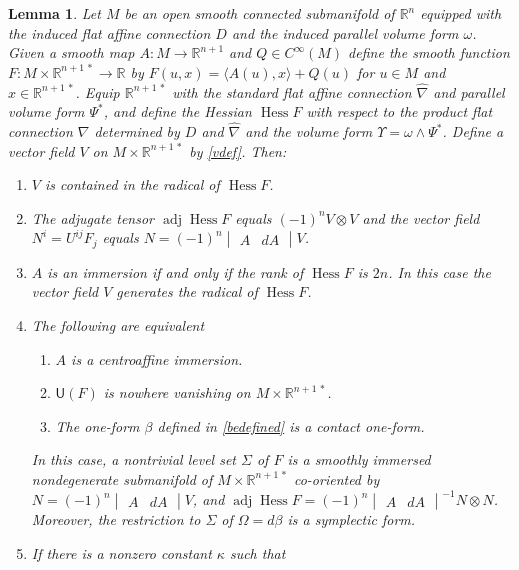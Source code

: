 \documentclass [leqno, 10pt]{amsart}
\newtheorem{lemma}[theorem]{Lemma}
\theoremstyle{definition}
\numberwithin{equation}{section}
\newcommand{\Om}{\Omega}
\newcommand{\U}{\mathsf{U}}
\newcommand{\om}{\omega}
\newcommand{\hess}{\operatorname{Hess}}
\newcommand{\adj}{\operatorname{adj}}
\newcommand{\ka}{\kappa}
\newcommand{\cinf}{C^{\infty}}
\newcommand{\lb}{\langle}
\newcommand{\ra}{\rangle}
\newcommand{\be}{\beta}
\newcommand{\hnabla}{\widehat{\nabla}}
\newcommand{\tensor}{\otimes}
\newcommand{\rea}{\mathbb R}
\begin{document}
\begin{lemma}\label{immersionlemma}
Let $M$ be an open smooth connected submanifold of $\rea^{n}$ equipped with the induced flat affine connection $D$ and the induced parallel volume form $\om$. Given a smooth map $A:M \to \rea^{n+1}$ and $Q \in \cinf(M)$ define the smooth function $F:M \times \rea^{n+1\,\ast} \to \rea$ by $F(u, x) =\lb A(u), x\ra + Q(u)$ for $u \in M$ and $x \in \rea^{n+1\,\ast}$. Equip $\rea^{n+1\,\ast}$ with the standard flat affine connection $\hnabla$ and parallel volume form $\Psi^{\ast}$, and define the Hessian $\hess F$ with respect to the product flat connection $\nabla$ determined by $D$ and $\hnabla$ and the volume form $\Upsilon = \om \wedge \Psi^{\ast}$. Define a vector field $V$ on $M \times \rea^{n+1\,\ast}$ by \eqref{vdef}. Then:
\begin{enumerate}
\item $V$ is contained in the radical of $\hess F$.
\item\label{uvv} The adjugate tensor $\adj \hess F$ equals $(-1)^{n}V \tensor V$ and the vector field $N^{i}= U^{ij}F_{j}$ equals $N = (-1)^{n}\begin{vmatrix} A & dA \end{vmatrix}V$.
\item $A$ is an immersion if and only if the rank of $\hess F$ is $2n$. In this case the vector field $V$ generates the radical of $\hess F$.
\item\label{cau} The following are equivalent
\begin{enumerate}
\item $A$ is a centroaffine immersion.
\item $\U(F)$ is nowhere vanishing on $M \times \rea^{n+1\,\ast}$. 
\item The one-form $\be$ defined in \eqref{bedefined} is a contact one-form.
\end{enumerate}
In this case, a nontrivial level set $\Sigma$ of $F$ is a smoothly immersed nondegenerate submanifold of $M \times \rea^{n+1\,\ast}$ co-oriented by $N = (-1)^{n}\begin{vmatrix} A & dA \end{vmatrix}V$, and $\adj \hess F = (-1)^{n}\begin{vmatrix} A & dA \end{vmatrix}^{-1}N \tensor N$. Moreover, the restriction to $\Sigma$ of $\Om = d\be$ is a symplectic form.
\item If there is a nonzero constant $\ka$ such that
\begin{align}\label{adak}

\end{align}
\end{enumerate}
\end{lemma}
\end{document}

